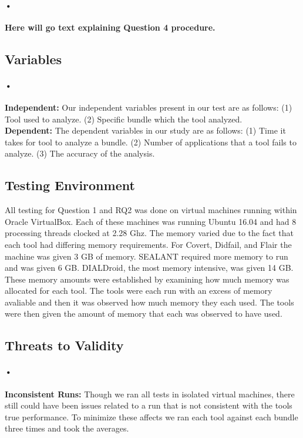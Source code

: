 \documentclass[twocolumn]{article}
\begin{document}
\paragraph{•}
	\textbf{Here will go text explaining Question 4 procedure.}

\subsection{Variables}
\paragraph{•}
	\textbf{Independent:} Our independent variables present in our test are as follows: (1) Tool used to analyze. (2) Specific bundle which the tool analyzed.\\
	\textbf{Dependent:} The dependent variables in our study are as follows: (1) Time it takes for tool to analyze a bundle. (2) Number of applications that a tool fails to analyze. (3) The accuracy of the analysis.
	
\subsection{Testing Environment}
	All testing for Question 1 and RQ2 was done on virtual machines running within Oracle VirtualBox. Each of these machines was running Ubuntu 16.04 and had 8 processing threads clocked at 2.28 Ghz. The memory varied due to the fact that each tool had differing memory requirements. For Covert, Didfail, and Flair the machine was given 3 GB of memory. SEALANT required more memory to run and was given 6 GB. DIALDroid, the most memory intensive, was given 14 GB. These memory amounts were established by examining how much memory was allocated for each tool. The tools were each run with an excess of memory avaliable and then it was observed how much memory they each used. The tools were then given the amount of memory that each was observed to have used.
\subsection{Threats to Validity}
\paragraph{•}
	\textbf{Inconsistent Runs:} Though we ran all tests in isolated virtual machines, there still could have been issues related to a run that is not consistent with the tools true performance. To minimize these affects we ran each tool against each bundle three times and took the averages.
\end{document}
